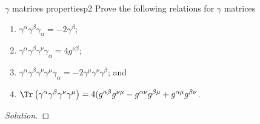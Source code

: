 \begin{problem}{\(\gamma\) matrices properties}{p2}
   Prove the following relations for \(\gamma\) matrices
   \begin{enumerate}[label=(\alph*)]
       \item \(\gamma^\alpha \gamma^\beta \gamma_\alpha = - 2\gamma^\beta\);
       \item \(\gamma^\alpha \gamma^\beta \gamma^\nu \gamma_\alpha = 4 g^{\nu \beta}\);
       \item \(\gamma^\alpha \gamma^\beta \gamma^\nu \gamma^\mu \gamma_\alpha = -2 \gamma^\mu \gamma^\nu \gamma^\beta\); and
       \item \(\Tr\left(\gamma^\alpha \gamma^\beta \gamma^\nu \gamma^\mu\right) = 4(g^{\alpha \beta} g^{\nu \mu} - g^{\alpha \nu} g^{\beta \mu} + g^{\alpha \mu} g^{\beta \nu}\).
   \end{enumerate}
\end{problem}
\begin{proof}[Solution]
    
\end{proof}
